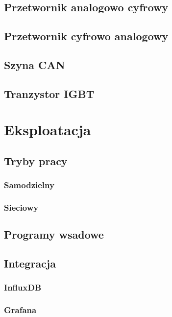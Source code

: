 \documentclass{beamer}
\begin{document}
        \subsection{Przetwornik analogowo cyfrowy}
        
        \subsection{Przetwornik cyfrowo analogowy}
        
        \subsection{Szyna CAN}
        
        \subsection{Tranzystor IGBT}
        
	\section{Eksploatacja}
        \subsection{Tryby pracy}
        
            \subsubsection{Samodzielny}
            
            \subsubsection{Sieciowy}
            
        \subsection{Programy wsadowe}
            
        \subsection{Integracja}
        
            \subsubsection{InfluxDB}
            
            \subsubsection{Grafana}
            
\end{document}

